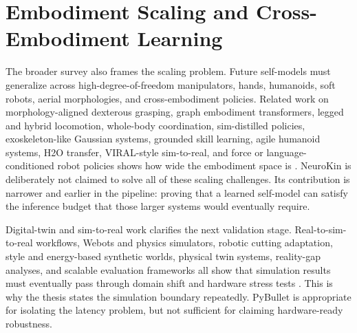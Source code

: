 \documentclass[12pt,a4paper,oneside]{report}
\begin{document}
\section{Embodiment Scaling and Cross-Embodiment Learning}

The broader survey also frames the scaling problem. Future self-models must generalize across high-degree-of-freedom manipulators, hands, humanoids, soft robots, aerial morphologies, and cross-embodiment policies. Related work on morphology-aligned dexterous grasping, graph embodiment transformers, legged and hybrid locomotion, whole-body coordination, sim-distilled policies, exoskeleton-like Gaussian systems, grounded skill learning, agile humanoid systems, H2O transfer, VIRAL-style sim-to-real, and force or language-conditioned robot policies shows how wide the embodiment space is \cite{wang2026fast,guo2026moeact,chen2026adacleargrasp,li2026forcevla2,miyamichi2025flexible,tan2018simtoreal,tan2026characterization,thomas2026embodied,wu2025dexgrasp,patel2024getzero,patrizi2026rlagmpc,liang2025wholebody,levy2024simdist,wang2026exogs,escontrela2025gaussgym,jin2026grounding,zhao2026agile,he2024h2o,he2024viral}. NeuroKin is deliberately not claimed to solve all of these scaling challenges. Its contribution is narrower and earlier in the pipeline: proving that a learned self-model can satisfy the inference budget that those larger systems would eventually require.

Digital-twin and sim-to-real work clarifies the next validation stage. Real-to-sim-to-real workflows, Webots and physics simulators, robotic cutting adaptation, style and energy-based synthetic worlds, physical twin systems, reality-gap analyses, and scalable evaluation frameworks all show that simulation results must eventually pass through domain shift and hardware stress tests \cite{torne2024rialto,hadi2021webots,hathaway2024cutting,hathaway2026neuralstyle,huang2024enerverse,heiden2022inferring,abou2024realissim,jiang2024digitaltwin,zhang2025unipr,cai2025gausstwin,aljalbout2026realitygap,jain2025polaris,li2024simpler}. This is why the thesis states the simulation boundary repeatedly. PyBullet is appropriate for isolating the latency problem, but not sufficient for claiming hardware-ready robustness.
\end{document}
